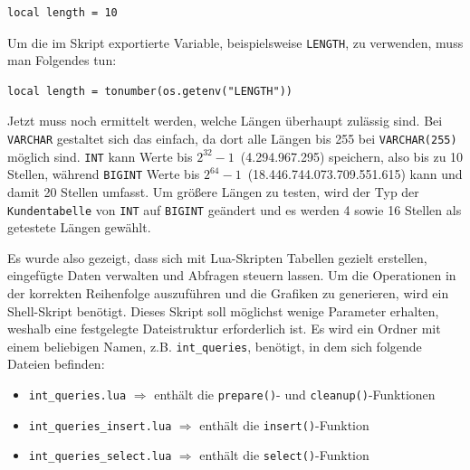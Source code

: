 \vspace{-5pt}
\begin{lstlisting}[language={[5.0]Lua},label={lst:tools-without-imported-length,style=custom_daniel}]
local length = 10
\end{lstlisting}
\vspace{-5pt}

Um die im Skript exportierte Variable, beispielsweise \texttt{LENGTH}, zu verwenden, muss man Folgendes tun:
\vspace{-5pt}
\begin{lstlisting}[language={[5.0]Lua},label={lst:tools-with-imported-length,style=custom_daniel}]
local length = tonumber(os.getenv("LENGTH"))
\end{lstlisting}
\vspace{-5pt}

Jetzt muss noch ermittelt werden, welche Längen überhaupt zulässig sind.
Bei \texttt{VARCHAR} gestaltet sich das einfach, da dort alle Längen bis 255 bei \texttt{VARCHAR(255)} möglich sind.
\texttt{INT} kann Werte bis \(2^{32} - 1\)~(4.294.967.295) speichern, also bis zu 10 Stellen, während \texttt{BIGINT} Werte bis \(2^{64} - 1\)~(18.446.744.073.709.551.615) kann und damit 20 Stellen umfasst.
Um größere Längen zu testen, wird der Typ der \texttt{Kundentabelle} von \texttt{INT} auf \texttt{BIGINT} geändert und es werden 4 sowie 16 Stellen als getestete Längen gewählt.

Es wurde also gezeigt, dass sich mit Lua-Skripten Tabellen gezielt erstellen, eingefügte Daten verwalten und Abfragen steuern lassen.
Um die Operationen in der korrekten Reihenfolge auszuführen und die Grafiken zu generieren, wird ein Shell-Skript benötigt.
Dieses Skript soll möglichst wenige Parameter erhalten, weshalb eine festgelegte Dateistruktur erforderlich ist.
Es wird ein Ordner mit einem beliebigen Namen, z.B. \texttt{int\_queries}, benötigt, in dem sich folgende Dateien befinden:

\begin{itemize}\label{files_structure}
    \setlength{\itemsep}{-5pt}
    \item \texttt{int\_queries.lua} $\Rightarrow$ enthält die \texttt{prepare()}- und \texttt{cleanup()}-Funktionen
    \item \texttt{int\_queries\_insert.lua} $\Rightarrow$ enthält die \texttt{insert()}-Funktion
    \item \texttt{int\_queries\_select.lua} $\Rightarrow$ enthält die \texttt{select()}-Funktion
\end{itemize}

